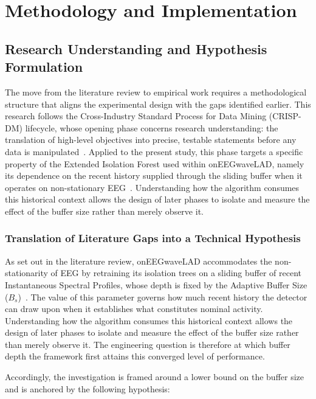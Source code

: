 \documentclass[MScCS,12pt,oneside,final]{uccthesis}
\begin{document}
\chapter{Methodology and Implementation}
\label{chap:methodology}
 
\section{Research Understanding and Hypothesis Formulation}
 
The move from the literature review to empirical work requires a methodological structure that aligns the experimental design with the gaps identified earlier. This research follows the Cross-Industry Standard Process for Data Mining (CRISP-DM) lifecycle, whose opening phase concerns research understanding: the translation of high-level objectives into precise, testable statements before any data is manipulated~\parencite{wirth2000crisp}. Applied to the present study, this phase targets a specific property of the Extended Isolation Forest used within onEEGwaveLAD, namely its dependence on the recent history supplied through the sliding buffer when it operates on non-stationary EEG~\parencite{longo2025oneegwavelad}. Understanding how the algorithm consumes this historical context allows the design of later phases to isolate and measure the effect of the buffer size rather than merely observe it.

\subsection{Translation of Literature Gaps into a Technical Hypothesis}
\label{subsec:literature_gaps_hypotheses}
 
As set out in the literature review, onEEGwaveLAD accommodates the non-stationarity of EEG by retraining its isolation trees on a sliding buffer of recent Instantaneous Spectral Profiles, whose depth is fixed by the Adaptive Buffer Size ($B_s$)~\parencite{longo2025oneegwavelad}. The value of this parameter governs how much recent history the detector can draw upon when it establishes what constitutes nominal activity. Understanding how the algorithm consumes this historical context allows the design of later phases to isolate and measure the effect of the buffer size rather than merely observe it. The engineering question is therefore at which buffer depth the framework first attains this converged level of performance.
 
Accordingly, the investigation is framed around a lower bound on the buffer size and is anchored by the following hypothesis:
 
\end{document}
